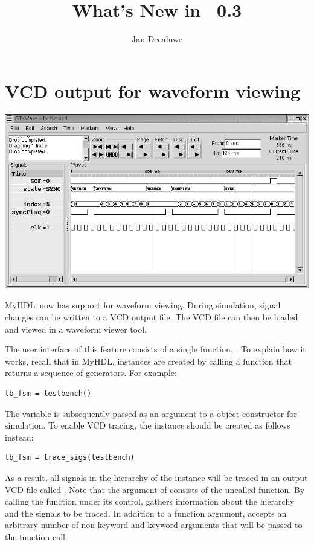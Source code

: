\documentclass{howto}
\title{What's New in \myhdl\ 0.3}
\author{Jan Decaluwe}
\newcommand{\myhdl}{\protect \mbox{MyHDL}}
\begin{document}
\maketitle
\tableofcontents


\section{VCD output for waveform viewing\label{section-wave}}

\ifpdf
\includegraphics{tbfsm.png}
\fi

\myhdl\ now has support for waveform viewing. During simulation, signal
changes can be written to a VCD output file.  The VCD file can then be
loaded and viewed in a waveform viewer tool.

The user interface of this feature consists of a single function,
.  To explain how it works, recall that in
\myhdl{}, instances are created by calling a function that returns a
sequence of generators. For example:

\begin{verbatim}
tb_fsm = testbench()
\end{verbatim}

The  variable is subsequently passed 
as an argument to a  object constructor
for simulation. To enable VCD tracing, the instance should 
be created as follows instead:

\begin{verbatim}
tb_fsm = trace_sigs(testbench)
\end{verbatim}

As a result, all signals in the hierarchy of the instance will be
traced in an output VCD file called . Note that the
argument of  consists of the uncalled
function. By calling the function under its control,
 gathers information about the hierarchy and
the signals to be traced.  In addition to a function argument,
 accepts an arbitrary number of non-keyword and
keyword arguments that will be passed to the function call.
\end{document}
